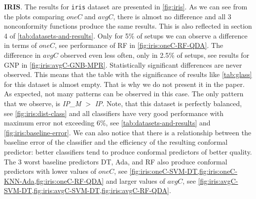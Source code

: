 \textbf{IRIS}. The results for \verb|iris| dataset are presented in \cref{fig:iris}. 
As we can see from the plots comparing $oneC$ and $avgC$, there is almost no difference
and all 3 nonconformity functions produce the same results.
This is also reflected in section 4 of \cref{tab:datasets-and-results}.
Only for 5\% of setups we can observe a difference in terms of $oneC$, see performance of RF in \cref{fig:iris:oneC-RF-QDA}.
The difference in $avgC$ observed even less often, only in 2.5\% of setups, see results for GNP in \cref{fig:iris:avgC-GNB-MPR}. 
Statistically significant differences are never observed.
This means that the table with the significance of results like \cref{tab:glass} for this dataset is
almost empty. That is why we do not present it in the paper.
As expected, not many patterns can be observed in this case. 
The only pattern that we observe, is \textit{IP\_M} $>$ \textit{IP}.
Note, that this dataset is perfectly balanced, see \cref{fig:iris:dist-class} and all classifiers have very good performance with maximum error not exceeding 6\%, see \cref{tab:datasets-and-results} and \cref{fig:iris:baseline-error}.
We can also notice that there is a relationship between the baseline error of the classifier and the 
efficiency of the resulting conformal predictor: better classifiers tend to produce conformal 
predictors of better quality.
The 3 worst baseline predictors DT, Ada, and RF also produce conformal predictors with lower values of $oneC$, see \cref{fig:iris:oneC-SVM-DT,fig:iris:oneC-KNN-Ada,fig:iris:oneC-RF-QDA} and larger values of $avgC$, see \cref{fig:iris:avgC-SVM-DT,fig:iris:avgC-SVM-DT,fig:iris:avgC-RF-QDA}.





